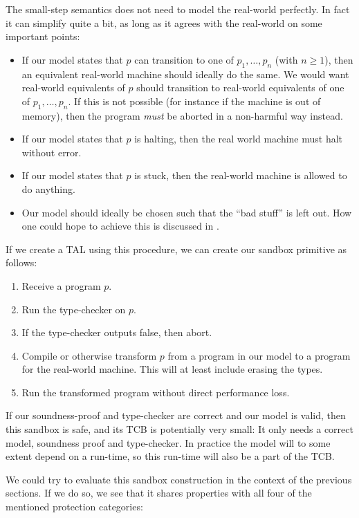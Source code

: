 The small-step semantics does not need to model the real-world perfectly. In
fact it can simplify quite a bit, as long as it agrees with the real-world
on some important points:

\begin{itemize}
\item If our model states that $p$ can transition to one of $p_1, \dots, p_n$
  (with $n \geq 1$), then an equivalent real-world machine should ideally do the
  same. We would want real-world equivalents of $p$ should transition to
  real-world equivalents of one of $p_1, \dots, p_n$. If this is not possible
  (for instance if the machine is out of memory), then the program \emph{must}
  be aborted in a non-harmful way instead.
\item If our model states that $p$ is halting, then the real world machine
  must halt without error.
\item If our model states that $p$ is stuck, then the real-world machine is
  allowed to do anything.
\item Our model should ideally be chosen such that the ``bad stuff'' is left
  out. How one could hope to achieve this is discussed in .
\end{itemize}

If we create a TAL using this procedure, we can create our sandbox primitive as
follows:

\begin{enumerate}
\item Receive a program $p$.
\item Run the type-checker on $p$.
\item If the type-checker outputs false, then abort.
\item Compile or otherwise transform $p$ from a program in our model to a
  program for the real-world machine. This will at least include erasing the
  types.
\item Run the transformed program without direct performance loss.
\end{enumerate}

If our soundness-proof and type-checker are correct and our model is valid, then
this sandbox is safe, and its TCB is potentially very small: It only needs a
correct model, soundness proof and type-checker. In practice the model will to
some extent depend on a run-time, so this run-time will also be a part of the
TCB.

We could try to evaluate this sandbox construction in the context of the
previous sections. If we do so, we see that it shares properties with all four
of the mentioned protection categories:

